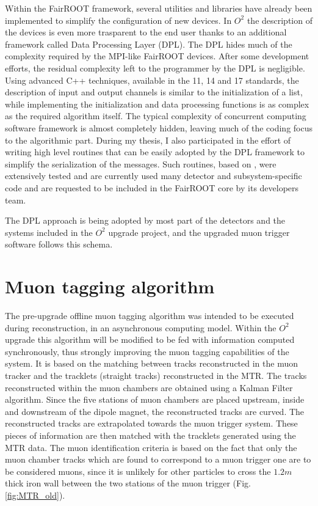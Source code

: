 Within the FairROOT framework, several utilities and libraries have already been implemented to simplify the configuration of new devices.
In $O^2$ the description of the devices is even more trasparent to the end user thanks to an additional framework called Data Processing Layer (DPL).
The DPL hides much of the complexity required by the MPI-like FairROOT devices.
After some development efforts, the residual complexity left to the programmer by the DPL is negligible.
Using advanced C++ techniques, available in the 11, 14 and 17 standards, the description of input and output channels is similar to the initialization of a list, while implementing the initialization and data processing functions is as complex as the required algorithm itself.
The typical complexity of concurrent computing software framework is almost completely hidden, leaving much of the coding focus to the algorithmic part.
During my thesis, I also participated in the effort of writing high level routines that can be easily adopted by the DPL framework to simplify the serialization of the messages. 
Such routines, based on , were extensively tested and are currently used many detector and subsystem-specific code and are requested to be included in the FairROOT core by its developers team.

The DPL approach is being adopted by most part of the detectors and the systems included in the $O^2$ upgrade project, and the upgraded muon trigger software follows this schema.

\section{Muon tagging algorithm}
\label{MTR_tagging}
The pre-upgrade offline muon tagging algorithm was intended to be executed during reconstruction, in an asynchronous computing model.
Within the $O^2$ upgrade this algorithm will be modified to be fed with information computed synchronously, thus strongly improving the muon tagging capabilities of the system.
It is based on the matching between tracks reconstructed in the muon tracker and the tracklets (straight tracks) reconstructed in the MTR.
The tracks reconstructed within the muon chambers are obtained using a Kalman Filter algorithm.
Since the five stations of muon chambers are placed upstream, inside and downstream of the dipole magnet, the reconstructed tracks are curved.
The reconstructed tracks are extrapolated towards the muon trigger system.
These pieces of information are then matched with the tracklets generated using the MTR data.
The muon identification criteria is based on the fact that only the muon chamber tracks which are found to correspond to a muon trigger one are to be considered muons, since it is unlikely for other particles to cross the $1.2m$ thick iron wall between the two stations of the muon trigger (Fig. \ref{fig:MTR_old}).

